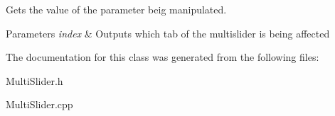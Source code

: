 Gets the value of the parameter beig manipulated. 


\begin{DoxyParams}{Parameters}
{\em index} & Outputs which tab of the multislider is being affected \\
\hline
\end{DoxyParams}


The documentation for this class was generated from the following files\+:\begin{DoxyCompactItemize}
\item 
Multi\+Slider.\+h\item 
Multi\+Slider.\+cpp\end{DoxyCompactItemize}
